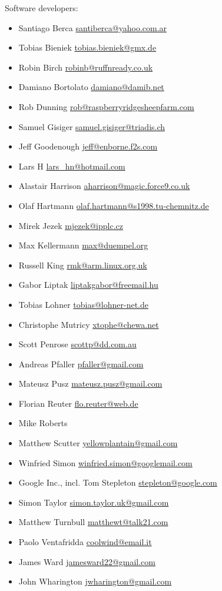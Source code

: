 Software developers:
\begin{itemize}
\item Santiago Berca \url{santiberca@yahoo.com.ar}
\item Tobias Bieniek \url{tobias.bieniek@gmx.de}
\item Robin Birch \url{robinb@ruffnready.co.uk}
\item Damiano Bortolato \url{damiano@damib.net}
\item Rob Dunning \url{rob@raspberryridgesheepfarm.com}
\item Samuel Gisiger \url{samuel.gisiger@triadis.ch}
\item Jeff Goodenough \url{jeff@enborne.f2s.com}
\item Lars H \url{lars_hn@hotmail.com}
\item Alastair Harrison \url{aharrison@magic.force9.co.uk}
\item Olaf Hartmann \url{olaf.hartmann@s1998.tu-chemnitz.de}
\item Mirek Jezek \url{mjezek@ipplc.cz}
\item Max Kellermann \url{max@duempel.org}
\item Russell King \url{rmk@arm.linux.org.uk}
\item Gabor Liptak \url{liptakgabor@freemail.hu}
\item Tobias Lohner \url{tobias@lohner-net.de}
\item Christophe Mutricy \url{xtophe@chewa.net}
\item Scott Penrose \url{scottp@dd.com.au}
\item Andreas Pfaller \url{pfaller@gmail.com}
\item Mateusz Pusz \url{mateusz.pusz@gmail.com}
\item Florian Reuter \url{flo.reuter@web.de}
\item Mike Roberts 
\item Matthew Scutter \url{yellowplantain@gmail.com}
\item Winfried Simon \url{winfried.simon@googlemail.com}
\item Google Inc., incl. Tom Stepleton \url{stepleton@google.com}
\item Simon Taylor \url{simon.taylor.uk@gmail.com}
\item Matthew Turnbull \url{matthewt@talk21.com}
\item Paolo Ventafridda \url{coolwind@email.it}
\item James Ward \url{jamesward22@gmail.com}
\item John Wharington \url{jwharington@gmail.com}
\end{itemize}


